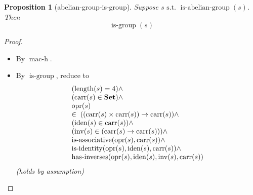 \documentclass[11pt]{article}
\theoremstyle{plain}
\newtheorem{proposition}{Proposition}
\begin{document}
\begin{proposition}[abelian-group-is-group]
Suppose $s \text{ s.t. } \operatorname{is\text{-}abelian\text{-}group}(s)$. Then
\begin{equation*}
\operatorname{is\text{-}group}(s)
\end{equation*}

\end{proposition}

\begin{proof}
\begin{itemize}[leftmargin=2.8em, itemsep=4pt, parsep=1pt]
  \item[\textbf{3}] By $\operatorname{mac\text{-}h}$.
  \item[\textbf{4--27}] By $\operatorname{is\text{-}group}$, reduce to
\begin{equation*}
\begin{array}{@{}l@{}} (\operatorname{length}(s) = 4) \wedge \\ (\operatorname{carr}(s) \in \mathbf{Set}) \wedge \\ \operatorname{opr}(s) \\ \in\; ((\operatorname{carr}(s) \times \operatorname{carr}(s)) \to \operatorname{carr}(s)) \wedge \\ (\operatorname{iden}(s) \in \operatorname{carr}(s)) \wedge \\ (\operatorname{inv}(s) \in (\operatorname{carr}(s) \to \operatorname{carr}(s))) \wedge \\ \operatorname{is\text{-}associative}(\operatorname{opr}(s), \operatorname{carr}(s)) \wedge \\ \operatorname{is\text{-}identity}(\operatorname{opr}(s), \operatorname{iden}(s), \operatorname{carr}(s)) \wedge \\ \operatorname{has\text{-}inverses}(\operatorname{opr}(s), \operatorname{iden}(s), \operatorname{inv}(s), \operatorname{carr}(s)) \end{array}
\end{equation*}
  \emph{(holds by assumption)}
\end{itemize}
\end{proof}
\end{document}
